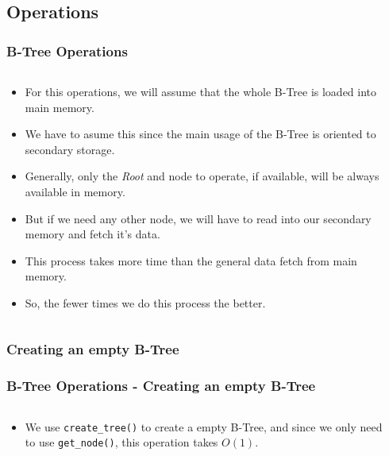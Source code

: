 \documentclass{beamer}
\begin{document}
\begin{frame}
    \subsection{Operations}
    \frametitle{B-Tree Operations}
    \begin{columns}
        \begin{column}{\textlecolumn}
            \begin{block}{}
                \begin{itemize}
                    \item For this operations, we will assume that the whole B-Tree is loaded into main memory.
                    \item We have to asume this since the main usage of the B-Tree is oriented to secondary storage.
                    \item Generally, only the \emph{Root} and node to operate, if available, will be always available in memory.
                    \item But if we need any other node, we will have to read into our secondary memory and fetch it's data.
                    \item This process takes more time than the general data fetch from main memory.
                    \item So, the fewer times we do this process the better.
                \end{itemize}
            \end{block}
        \end{column}
        \begin{column}{\textricolumn}
        \end{column}
    \end{columns}
\end{frame}
\begin{frame}
    \subsubsection{Creating an empty B-Tree}
    \frametitle{B-Tree Operations - Creating an empty B-Tree}
    \begin{columns}
        \begin{column}{\textlecolumn}
            \begin{block}{}
                \begin{itemize}
                    \item We use \lstinline|create_tree()| to create a empty B-Tree, and since we only need to use \lstinline|get_node()|, this operation takes \(O(1)\).
                \end{itemize}
            \end{block}
            \begin{block}
                \btreeCreateEmpty
            \end{block}
        \end{column}
        \begin{column}{\textricolumn}
        \end{column}
    \end{columns}
\end{frame}
\end{document}
